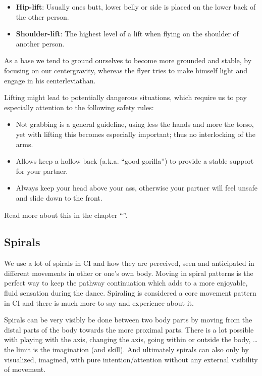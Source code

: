 \begin{itemize}
    \item \textbf{Hip-lift}: Usually ones butt, lower belly or side is placed on the lower back of the other person.
    \item \textbf{Shoulder-lift}: The highest level of a lift when flying on the shoulder of another person.
\end{itemize}

As a base we tend to ground ourselves to become more grounded and stable, by focusing on our \gls{centergravity},
whereas the flyer tries to make himself light and engage in his \gls{centerleviathan}.

Lifting might lead to potentially dangerous situations, which require us to pay especially attention to the following safety rules:

\begin{itemize}
    \item Not grabbing is a general guideline, using less the hands and more the torso, yet with lifting this becomes especially important; thus no interlocking of the arms.
    \item Allows keep a hollow back (a.k.a. ``good gorilla'') to provide a stable support for your partner.
    \item Always keep your head above your ass, otherwise your partner will feel unsafe and slide down to the front.
\end{itemize}

Read more about this in the chapter ``''.

\subsection{Spirals}\label{subsec:spirals}

We use a lot of spirals in CI and how they are perceived, seen and anticipated in different movements in other or one's own body.
Moving in spiral patterns is the perfect way to keep the pathway continuation which adds to a more enjoyable, fluid sensation during the dance.
Spiraling is considered a core movement pattern in CI and there is much more to say and experience about it.

Spirals can be very visibly be done between two body parts by moving from the distal parts of the body towards the more proximal parts.
There is a lot possible with playing with the axis, changing the axis, going within or outside the body, \ldots the limit is the imagination (and skill).
And ultimately spirals can also only by visualized, imagined, with pure intention/attention without any external visibility of movement.

